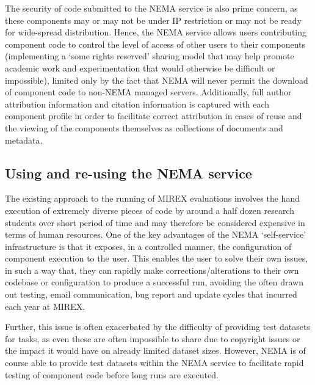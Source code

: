 \documentclass[conference]{IEEEtran}
\begin{document}
The security of code submitted to the NEMA service is also prime concern, as these components may or may not be under IP restriction or may not be ready for wide-spread distribution. Hence, the NEMA service allows users contributing component code to control the level of access of other users to their components (implementing a `some rights reserved' sharing model that may help promote academic work and experimentation that would otherwise be difficult or impossible), limited only by the fact that NEMA will never permit the download of component code to non-NEMA managed servers.
Additionally, full author attribution information and citation information is captured with each component profile in order to facilitate correct attribution in cases of reuse and the viewing of the components themselves as collections of documents and metadata. 

\subsection{Using and re-using the NEMA service}
The existing approach to the running of MIREX evaluations involves the hand execution of extremely diverse pieces of code by around a half dozen research students over short period of time and may therefore be considered expensive in terms of human resources.  One of the key advantages of the NEMA `self-service' infrastructure is that it exposes, in a controlled manner, the configuration of component execution to the user. This enables the user to solve their own issues, in such a way that, they can rapidly make corrections/alterations to their own codebase or configuration to produce a successful run, avoiding the often drawn out testing, email communication, bug report and update cycles that incurred each year at MIREX.
 
Further, this issue is often exacerbated by the difficulty of providing test datasets for tasks, as even these are often impossible to share due to copyright issues or the impact it would have on already limited dataset sizes. However, NEMA is of course able to provide test datasets within the NEMA service to facilitate rapid testing of component code before long runs are executed. 
\end{document}
